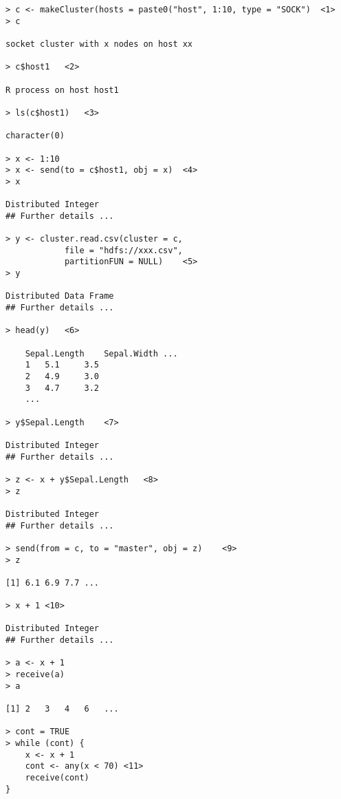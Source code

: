 \documentclass[a4paper,10pt]{article}
\begin{document}
\begin{verbatim}
> c <- makeCluster(hosts = paste0("host", 1:10, type = "SOCK")	<1>
> c

socket cluster with x nodes on host xx

> c$host1	<2>

R process on host host1

> ls(c$host1)	<3>

character(0)

> x <- 1:10
> x <- send(to = c$host1, obj = x)	<4>
> x

Distributed Integer
## Further details ...

> y <- cluster.read.csv(cluster = c, 
			file = "hdfs://xxx.csv",
			partitionFUN = NULL)	<5>
> y

Distributed Data Frame
## Further details ...

> head(y)	<6>

	Sepal.Length	Sepal.Width	...
	1	5.1		3.5
	2	4.9		3.0
	3	4.7		3.2
	...

> y$Sepal.Length	<7>

Distributed Integer
## Further details ...

> z <- x + y$Sepal.Length	<8>
> z

Distributed Integer
## Further details ...

> send(from = c, to = "master", obj = z)	<9>
> z

[1]	6.1	6.9	7.7	...

> x + 1	<10>

Distributed Integer
## Further details ...

> a <- x + 1
> receive(a)
> a

[1]	2	3	4	6	...

> cont = TRUE
> while (cont) {
	x <- x + 1
	cont <- any(x < 70)	<11>
	receive(cont)
}
\end{verbatim}
\end{document}

